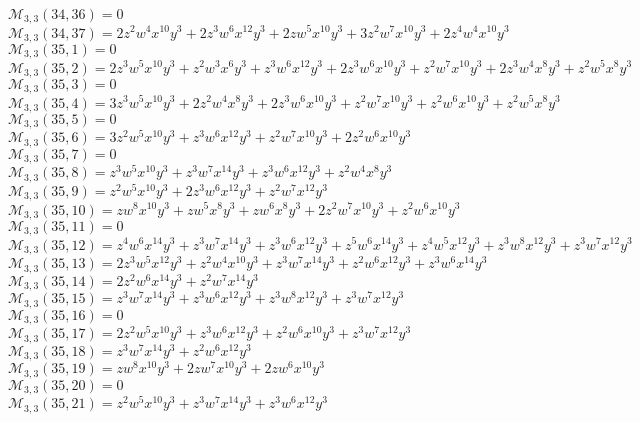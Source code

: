 \documentclass[12pt]{memoireuqam1.3}
\begin{document}
$\mathcal{M}_{3,3}(34,36)=0$\\
$\mathcal{M}_{3,3}(34,37)=2z^2w^4x^{10}y^3+2z^3w^6x^{12}y^3+2zw^5x^{10}y^3+3z^2w^7x^{10}y^3+2z^4w^4x^{10}y^3$\\
$\mathcal{M}_{3,3}(35,1)=0$\\
$\mathcal{M}_{3,3}(35,2)=2z^3w^5x^{10}y^3+z^2w^3x^6y^3+z^3w^6x^{12}y^3+2z^3w^6x^{10}y^3+z^2w^7x^{10}y^3+2z^3w^4x^8y^3+z^2w^5x^8y^3$\\
$\mathcal{M}_{3,3}(35,3)=0$\\
$\mathcal{M}_{3,3}(35,4)=3z^3w^5x^{10}y^3+2z^2w^4x^8y^3+2z^3w^6x^{10}y^3+z^2w^7x^{10}y^3+z^2w^6x^{10}y^3+z^2w^5x^8y^3$\\
$\mathcal{M}_{3,3}(35,5)=0$\\
$\mathcal{M}_{3,3}(35,6)=3z^2w^5x^{10}y^3+z^3w^6x^{12}y^3+z^2w^7x^{10}y^3+2z^2w^6x^{10}y^3$\\
$\mathcal{M}_{3,3}(35,7)=0$\\
$\mathcal{M}_{3,3}(35,8)=z^3w^5x^{10}y^3+z^3w^7x^{14}y^3+z^3w^6x^{12}y^3+z^2w^4x^8y^3$\\
$\mathcal{M}_{3,3}(35,9)=z^2w^5x^{10}y^3+2z^3w^6x^{12}y^3+z^2w^7x^{12}y^3$\\
$\mathcal{M}_{3,3}(35,10)=zw^8x^{10}y^3+zw^5x^8y^3+zw^6x^8y^3+2z^2w^7x^{10}y^3+z^2w^6x^{10}y^3$\\
$\mathcal{M}_{3,3}(35,11)=0$\\
$\mathcal{M}_{3,3}(35,12)=z^4w^6x^{14}y^3+z^3w^7x^{14}y^3+z^3w^6x^{12}y^3+z^5w^6x^{14}y^3+z^4w^5x^{12}y^3+z^3w^8x^{12}y^3+z^3w^7x^{12}y^3$\\
$\mathcal{M}_{3,3}(35,13)=2z^3w^5x^{12}y^3+z^2w^4x^{10}y^3+z^3w^7x^{14}y^3+z^2w^6x^{12}y^3+z^3w^6x^{14}y^3$\\
$\mathcal{M}_{3,3}(35,14)=2z^2w^6x^{14}y^3+z^2w^7x^{14}y^3$\\
$\mathcal{M}_{3,3}(35,15)=z^3w^7x^{14}y^3+z^3w^6x^{12}y^3+z^3w^8x^{12}y^3+z^3w^7x^{12}y^3$\\
$\mathcal{M}_{3,3}(35,16)=0$\\
$\mathcal{M}_{3,3}(35,17)=2z^2w^5x^{10}y^3+z^3w^6x^{12}y^3+z^2w^6x^{10}y^3+z^3w^7x^{12}y^3$\\
$\mathcal{M}_{3,3}(35,18)=z^3w^7x^{14}y^3+z^2w^6x^{12}y^3$\\
$\mathcal{M}_{3,3}(35,19)=zw^8x^{10}y^3+2zw^7x^{10}y^3+2zw^6x^{10}y^3$\\
$\mathcal{M}_{3,3}(35,20)=0$\\
$\mathcal{M}_{3,3}(35,21)=z^2w^5x^{10}y^3+z^3w^7x^{14}y^3+z^3w^6x^{12}y^3$\\
\end{document}
